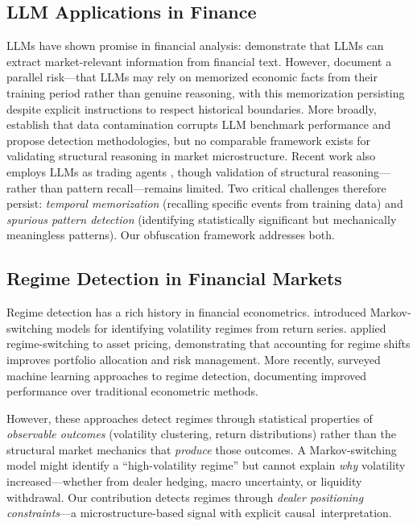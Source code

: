 \documentclass[jrfm,article,accept,moreauthors,pdftex]{Definitions/mdpi}
\begin{document}
\subsection{LLM Applications in Finance}

LLMs have shown promise in financial analysis: \citet{lopez2023can} demonstrate that LLMs can extract market-relevant information from financial text. However, \citet{lopezlira2025memorization} document a parallel risk---that LLMs may rely on memorized economic facts from their training period rather than genuine reasoning, with this memorization persisting despite explicit instructions to respect historical boundaries. More broadly, \citet{dong2024generalization} establish that data contamination corrupts LLM benchmark performance and propose detection methodologies, but no comparable framework exists for validating structural reasoning in market microstructure. Recent work also employs LLMs as trading agents \citep{yang2024tradingagents}, though validation of structural reasoning---rather than pattern recall---remains limited. Two critical challenges therefore persist: \textit{temporal memorization} (recalling specific events from training data) and \textit{spurious pattern detection} (identifying statistically significant but mechanically meaningless patterns). Our obfuscation framework addresses both.

\subsection{Regime Detection in Financial Markets}

Regime detection has a rich history in financial econometrics. \citet{hamilton1989new} introduced Markov-switching models for identifying volatility regimes from return series. \citet{ang2002regime} applied regime-switching to asset pricing, demonstrating that accounting for regime shifts improves portfolio allocation and risk management. More recently, \citet{nystrup2020regime} surveyed machine learning approaches to regime detection, documenting improved performance over traditional econometric methods.

However, these approaches detect regimes through statistical properties of \textit{observable outcomes} (volatility clustering, return distributions) rather than the structural market mechanics that \textit{produce} those outcomes. A Markov-switching model might identify a ``high-volatility regime'' but cannot explain \textit{why} volatility increased---whether from dealer hedging, macro uncertainty, or liquidity withdrawal. Our contribution detects regimes through \textit{dealer positioning constraints}---a microstructure-based signal with explicit \mbox{causal interpretation.}
\end{document}
